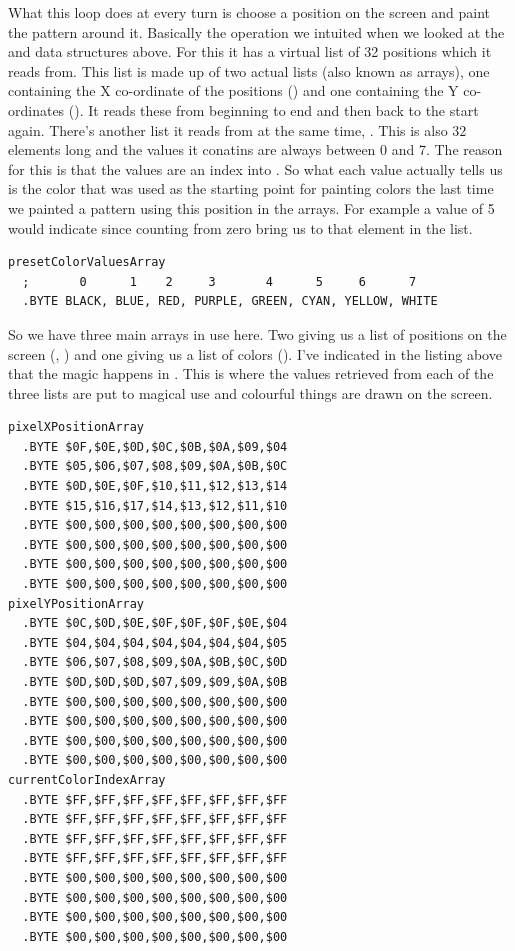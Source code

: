 What this loop does at every turn is choose a position on the screen and paint the pattern around it. Basically the operation we intuited
when we looked at the  and  data structures above. For this it has a virtual list of
32 positions which it reads from. This list is made up of two actual lists (also known as arrays), one containing the X co-ordinate
of the positions () and one containing the Y co-ordinates (). It reads these
from beginning to end and then back to the start again. There's another list it reads from at the same time, .
This is also 32 elements long and the values it conatins are always between 0 and 7. The reason for this is that the values
are an index into . So
what each value actually tells us is the color that was used as the starting point for painting colors the last time we painted a pattern
using this position in the arrays. For example a value of 5 would indicate  since counting from zero bring us to that element
in the list.

\begin{lstlisting}
presetColorValuesArray
  ;       0      1    2     3       4      5     6      7
  .BYTE BLACK, BLUE, RED, PURPLE, GREEN, CYAN, YELLOW, WHITE
\end{lstlisting}

So we have three main arrays in use here. Two giving us a list of positions on the screen (, )
and one giving us a list of colors (). I've indicated in the listing above that the magic happens in 
. This is where the values retrieved from each of the three lists are put to magical use and colourful things
are drawn on the screen.

\begin{lstlisting}[caption=The arrays have a larger capacity than is actually used\, each one above is 64 bytes long.]
pixelXPositionArray   
  .BYTE $0F,$0E,$0D,$0C,$0B,$0A,$09,$04
  .BYTE $05,$06,$07,$08,$09,$0A,$0B,$0C
  .BYTE $0D,$0E,$0F,$10,$11,$12,$13,$14
  .BYTE $15,$16,$17,$14,$13,$12,$11,$10
  .BYTE $00,$00,$00,$00,$00,$00,$00,$00
  .BYTE $00,$00,$00,$00,$00,$00,$00,$00
  .BYTE $00,$00,$00,$00,$00,$00,$00,$00
  .BYTE $00,$00,$00,$00,$00,$00,$00,$00
pixelYPositionArray   
  .BYTE $0C,$0D,$0E,$0F,$0F,$0F,$0E,$04
  .BYTE $04,$04,$04,$04,$04,$04,$04,$05
  .BYTE $06,$07,$08,$09,$0A,$0B,$0C,$0D
  .BYTE $0D,$0D,$0D,$07,$09,$09,$0A,$0B
  .BYTE $00,$00,$00,$00,$00,$00,$00,$00
  .BYTE $00,$00,$00,$00,$00,$00,$00,$00
  .BYTE $00,$00,$00,$00,$00,$00,$00,$00
  .BYTE $00,$00,$00,$00,$00,$00,$00,$00
currentColorIndexArray   
  .BYTE $FF,$FF,$FF,$FF,$FF,$FF,$FF,$FF
  .BYTE $FF,$FF,$FF,$FF,$FF,$FF,$FF,$FF
  .BYTE $FF,$FF,$FF,$FF,$FF,$FF,$FF,$FF
  .BYTE $FF,$FF,$FF,$FF,$FF,$FF,$FF,$FF
  .BYTE $00,$00,$00,$00,$00,$00,$00,$00
  .BYTE $00,$00,$00,$00,$00,$00,$00,$00
  .BYTE $00,$00,$00,$00,$00,$00,$00,$00
  .BYTE $00,$00,$00,$00,$00,$00,$00,$00
\end{lstlisting}

